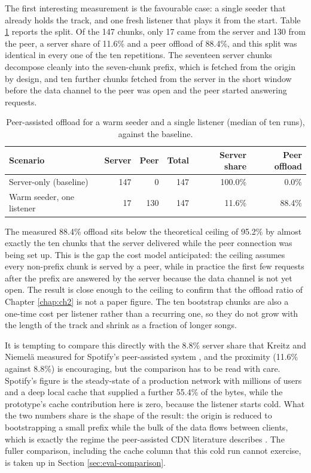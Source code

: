 \indent \par The first interesting measurement is the favourable case: a single seeder that already holds the track, and one fresh listener that plays it from the start. Table \ref{tab:eval-offload} reports the split. Of the 147 chunks, only 17 came from the server and 130 from the peer, a server share of 11.6\% and a peer offload of 88.4\%, and this split was identical in every one of the ten repetitions. The seventeen server chunks decompose cleanly into the seven-chunk prefix, which is fetched from the origin by design, and ten further chunks fetched from the server in the short window before the data channel to the peer was open and the peer started answering requests.

\begin{table}[htbp]
\centering
\begin{tabular}{|l|r|r|r|r|r|}
\hline
\textbf{Scenario} & \textbf{Server} & \textbf{Peer} & \textbf{Total} & \textbf{Server share} & \textbf{Peer offload} \\
\hline
Server-only (baseline) & 147 & 0 & 147 & 100.0\% & 0.0\% \\
Warm seeder, one listener & 17 & 130 & 147 & 11.6\% & 88.4\% \\
\hline
\end{tabular}
\caption{Peer-assisted offload for a warm seeder and a single listener (median of ten runs), against the baseline.}
\label{tab:eval-offload}
\end{table}

\par The measured 88.4\% offload sits below the theoretical ceiling of 95.2\% by almost exactly the ten chunks that the server delivered while the peer connection was being set up. This is the gap the cost model anticipated: the ceiling assumes every non-prefix chunk is served by a peer, while in practice the first few requests after the prefix are answered by the server because the data channel is not yet open. The result is close enough to the ceiling to confirm that the offload ratio of Chapter \ref{chap:ch2} is not a paper figure. The ten bootstrap chunks are also a one-time cost per listener rather than a recurring one, so they do not grow with the length of the track and shrink as a fraction of longer songs.

\par It is tempting to compare this directly with the 8.8\% server share that Kreitz and Niemel\"a measured for Spotify's peer-assisted system \cite{spotify_p2p}, and the proximity (11.6\% against 8.8\%) is encouraging, but the comparison has to be read with care. Spotify's figure is the steady-state of a production network with millions of users and a deep local cache that supplied a further 55.4\% of the bytes, while the prototype's cache contribution here is zero, because the listener starts cold. What the two numbers share is the shape of the result: the origin is reduced to bootstrapping a small prefix while the bulk of the data flows between clients, which is exactly the regime the peer-assisted CDN literature describes \cite{pa_cdn_survey, hybrid_cdn_p2p}. The fuller comparison, including the cache column that this cold run cannot exercise, is taken up in Section \ref{sec:eval-comparison}.

